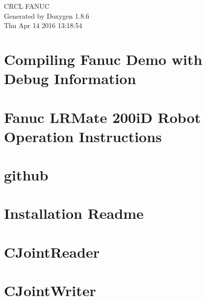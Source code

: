 \documentclass[twoside]{book}
\newcommand{\clearemptydoublepage}{%
  \newpage{\pagestyle{empty}\cleardoublepage}%
}
\begin{document}
\hypersetup{pageanchor=false}
\begin{titlepage}
\vspace*{7cm}
\begin{center}%
{\Large C\-R\-C\-L F\-A\-N\-U\-C }\\
\vspace*{1cm}
{\large Generated by Doxygen 1.8.6}\\
\vspace*{0.5cm}
{\small Thu Apr 14 2016 13:18:54}\\
\end{center}
\end{titlepage}
\clearemptydoublepage
\tableofcontents
\clearemptydoublepage
{}
\hypersetup{pageanchor=true}

\chapter{Compiling Fanuc Demo with Debug Information}
\label{md_markdown_Catkin_make_tips}
\hypertarget{md_markdown_Catkin_make_tips}{}

\chapter{Fanuc L\-R\-Mate 200i\-D Robot Operation Instructions}
\label{md_markdown_FanucRobotOperationInstructions}
\hypertarget{md_markdown_FanucRobotOperationInstructions}{}

\chapter{github}
\label{md_markdown_githubnotes}
\hypertarget{md_markdown_githubnotes}{}

\chapter{Installation Readme}
\label{md_markdown_Installation}
\hypertarget{md_markdown_Installation}{}

\chapter{C\-Joint\-Reader}
\label{md_markdown_JointReader}
\hypertarget{md_markdown_JointReader}{}

\chapter{C\-Joint\-Writer}
\label{md_markdown_JointWriter}
\hypertarget{md_markdown_JointWriter}{}

\end{document}
